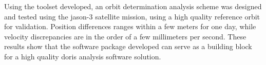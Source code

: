 Using the toolset developed, an orbit determination analysis scheme was designed and
tested using the \gls{jason}-3 satellite mission, using a high quality reference orbit
for validation. Position differences ranges within a few meters for one day, while
velocity discrepancies are in the order of a few millimeters per second. These results show
that the software package developed can serve as a building block for a high quality
\gls{doris} analysis software solution.
